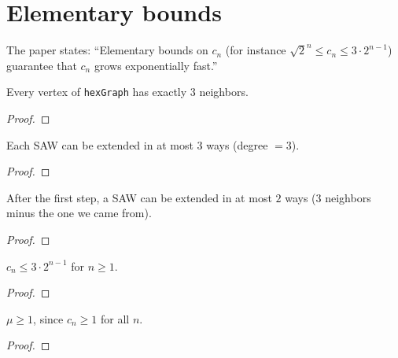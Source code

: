 
\chapter{Elementary bounds}\label{chap:elementary}

The paper states: ``Elementary bounds on $c_n$ (for instance $\sqrt{2}^n \leq c_n \leq 3 \cdot 2^{n-1}$)
guarantee that $c_n$ grows exponentially fast.''

\begin{lemma}\label{lem:hex_degree}
\leanok
{}
  Every vertex of \texttt{hexGraph} has exactly $3$ neighbors.
\end{lemma}
\begin{proof}
\leanok
\end{proof}

\begin{lemma}\label{lem:saw_step_le_three}
\leanok
{}
  Each SAW can be extended in at most $3$ ways (degree $= 3$).
\end{lemma}
\begin{proof}
\leanok
\end{proof}

\begin{lemma}\label{lem:saw_step_le_two}
\leanok
{}
  After the first step, a SAW can be extended in at most $2$ ways
  ($3$ neighbors minus the one we came from).
\end{lemma}
\begin{proof}
\leanok
\end{proof}

\begin{lemma}\label{lem:saw_upper}
\leanok
{}
  $c_n \leq 3 \cdot 2^{n-1}$ for $n \geq 1$.
\end{lemma}
\begin{proof}
\leanok
\end{proof}

\begin{theorem}\label{thm:cc_ge_one}
\leanok
{}
  $\mu \geq 1$, since $c_n \geq 1$ for all $n$.
\end{theorem}
\begin{proof}
\leanok
\end{proof}

